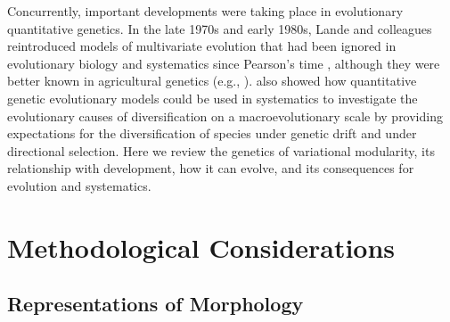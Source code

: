 \begin{refsection}
Concurrently, important developments were taking place in evolutionary
quantitative genetics. In the late 1970s and early 1980s, Lande and
colleagues \parencite{Lande1979-by, Lande1983-ez} reintroduced
models of multivariate evolution that had been ignored in evolutionary
biology and systematics since Pearson's time
\parencite{Pearson1896-va}, although they were
better known in agricultural genetics (e.g., \textcite{Hazel1943-uq}).
\textcite{Lande1979-by} also showed how
quantitative genetic evolutionary models could be used in systematics to
investigate the evolutionary causes of diversification on a
macroevolutionary scale by providing expectations for the
diversification of species under genetic drift and under directional
selection. Here we review the genetics of variational modularity, its
relationship with development, how it can evolve, and its consequences
for evolution and systematics.

\section{Methodological Considerations}

\subsection{Representations of Morphology}


\end{refsection}
